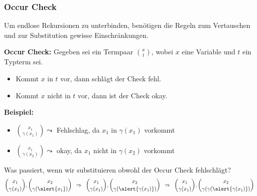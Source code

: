 \documentclass{beamer}
\begin{document}
\begin{frame} \frametitle{Occur Check}
	\footnotesize
	Um endlose Rekursionen zu unterbinden, benötigen die Regeln zum Vertauschen und zur Substitution gewisse Einschränkungen. 
		
	\textbf{Occur Check:}
	Gegeben sei ein Termpaar $\binom{x}{t}$, wobei $x$ eine Variable und $t$ ein Typterm sei.
	\vspace{-.5\baselineskip}
	\begin{itemize} 
		\item Kommt $x$ in $t$ vor, dann schlägt der Check fehl.
		\item Kommt $x$ nicht in $t$ vor, dann ist der Check okay.
	\end{itemize}

	\textbf{Beispiel:}
	\begin{itemize}
		\item $\displaystyle\binom{x_1}{\gamma(x_1)} \leadsto$ Fehlschlag, da $x_1$ in $\gamma(x_1)$ vorkommt
		\item $\displaystyle\binom{x_1}{\gamma(x_2)} \leadsto$ okay, da $x_1$ nicht in $\gamma(x_2)$ vorkommt
	\end{itemize}

	Was passiert, wenn wir substituieren obwohl der Occur Check fehlschlägt?
	\begin{equation*}
		\binom{x_1}{\gamma(x_1)}, \binom{x_2}{\gamma(\alert{x_1})}
		\follows
		\binom{x_1}{\gamma(x_1)}, \binom{x_2}{\gamma(\alert{\gamma(x_1)})}
		\follows
		\binom{x_1}{\gamma(x_1)}, \binom{x_2}{\gamma(\gamma(\alert{\gamma(x_1)})}
	\end{equation*}
\end{frame}
\end{document}
